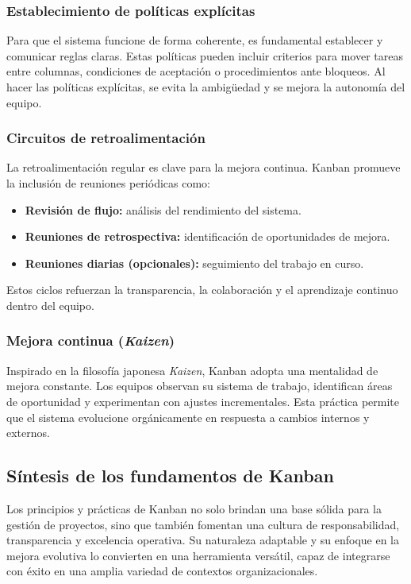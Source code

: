 \subsubsection{Establecimiento de políticas explícitas}

Para que el sistema funcione de forma coherente, es fundamental establecer y comunicar reglas claras. Estas políticas pueden incluir criterios para mover tareas entre columnas, condiciones de aceptación o procedimientos ante bloqueos. Al hacer las políticas explícitas, se evita la ambigüedad y se mejora la autonomía del equipo.

\subsubsection{Circuitos de retroalimentación}

La retroalimentación regular es clave para la mejora continua. Kanban promueve la inclusión de reuniones periódicas como:
\begin{itemize}
    \item \textbf{Revisión de flujo:} análisis del rendimiento del sistema.
    \item \textbf{Reuniones de retrospectiva:} identificación de oportunidades de mejora.
    \item \textbf{Reuniones diarias (opcionales):} seguimiento del trabajo en curso.
\end{itemize}

Estos ciclos refuerzan la transparencia, la colaboración y el aprendizaje continuo dentro del equipo.

\subsubsection{Mejora continua (\textit{Kaizen})}

Inspirado en la filosofía japonesa \textit{Kaizen}, Kanban adopta una mentalidad de mejora constante. Los equipos observan su sistema de trabajo, identifican áreas de oportunidad y experimentan con ajustes incrementales. Esta práctica permite que el sistema evolucione orgánicamente en respuesta a cambios internos y externos.

\subsection{Síntesis de los fundamentos de Kanban}

Los principios y prácticas de Kanban no solo brindan una base sólida para la gestión de proyectos, sino que también fomentan una cultura de responsabilidad, transparencia y excelencia operativa. Su naturaleza adaptable y su enfoque en la mejora evolutiva lo convierten en una herramienta versátil, capaz de integrarse con éxito en una amplia variedad de contextos organizacionales.
